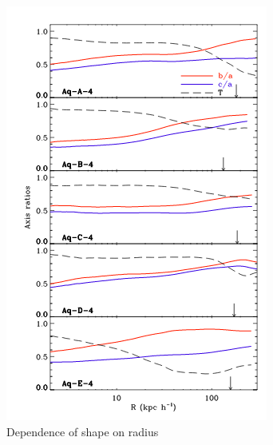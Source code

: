 \documentclass[xcolor=dvipsnames]{beamer}
\begin{document}

\begin{frame}

\begin{columns}[c]

\begin{column}{.4\textwidth}
\begin{figure}
\includegraphics[width=0.8\linewidth]{./pics/shapeRadius.png}
\caption{\tiny Dependence of shape on radius}
\end{figure}
\end{column}


\end{columns}
\end{frame}
\end{document}
